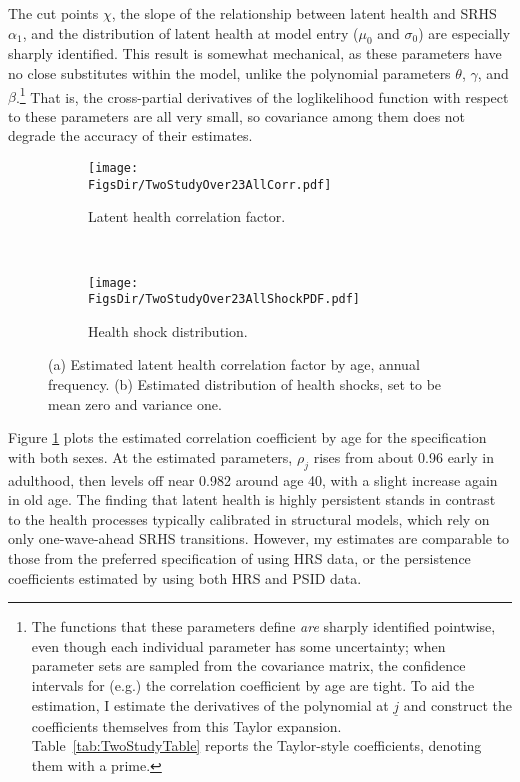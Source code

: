 \documentclass[12pt,pdftex,letterpaper]{article}
\newcommand{\Age}{j}
\newcommand{\AgeMin}{\underline{\Age}}
\newcommand{\Corr}{\rho}
\newcommand{\HealthInitMean}{\mu_0}
\newcommand{\HealthInitStd}{\sigma_0}
\newcommand{\Cut}{\chi}
\newcommand{\MortParam}{\theta}
\newcommand{\CorrParam}{\gamma}
\newcommand{\HealthParam}{\beta}
\newcommand{\LatentParam}{\alpha}
\newcommand{\RootDir}{..}
\newcommand{\FigsDir}{\RootDir/Figures}
\begin{document}
The cut points $\Cut$, the slope of the relationship between latent health and SRHS $\LatentParam_1$, and the distribution of latent health at model entry ($\HealthInitMean$ and $\HealthInitStd$) are especially sharply identified.  This result is somewhat mechanical, as these parameters have no close substitutes within the model, unlike the polynomial parameters $\MortParam$, $\CorrParam$, and $\HealthParam$.\footnote{The functions that these parameters define \textit{are} sharply identified pointwise, even though each individual parameter has some uncertainty; when parameter sets are sampled from the covariance matrix, the confidence intervals for (e.g.) the correlation coefficient by age are tight. To aid the estimation, I estimate the derivatives of the polynomial at $\AgeMin$ and construct the coefficients themselves from this Taylor expansion. Table~\ref{tab:TwoStudyTable} reports the Taylor-style coefficients, denoting them with a prime.}  That is, the cross-partial derivatives of the loglikelihood function with respect to these parameters are all very small, so covariance among them does not degrade the accuracy of their estimates.

\begin{figure}[t]
	\centering
	\begin{subfigure}[b]{0.48\textwidth}
		\texttt{[image: \\FigsDir/TwoStudyOver23AllCorr.pdf]}
		\caption{Latent health correlation factor.}\label{fig:Correlation}
	\end{subfigure}
	~
	\begin{subfigure}[b]{0.48\textwidth}
		\texttt{[image: \\FigsDir/TwoStudyOver23AllShockPDF.pdf]}
		\caption{Health shock distribution.}\label{fig:HealthShockDstn}
	\end{subfigure}
	\caption{(a) Estimated latent health correlation factor by age, annual frequency. (b) Estimated distribution of health shocks, set to be mean zero and variance one.}
\end{figure}

Figure \ref{fig:Correlation} plots the estimated correlation coefficient by age for the specification with both sexes. At the estimated parameters, $\Corr_\Age$ rises from about 0.96 early in adulthood, then levels off near 0.982 around age 40, with a slight increase again in old age. The finding that latent health is highly persistent stands in contrast to the health processes typically calibrated in structural models, which rely on only one-wave-ahead SRHS transitions. However, my estimates are comparable to those from  the preferred specification of \cite{Lange12} using HRS data, or the persistence coefficients estimated by \cite{HosseiniZhao21a} using both HRS and PSID data.
\end{document}
